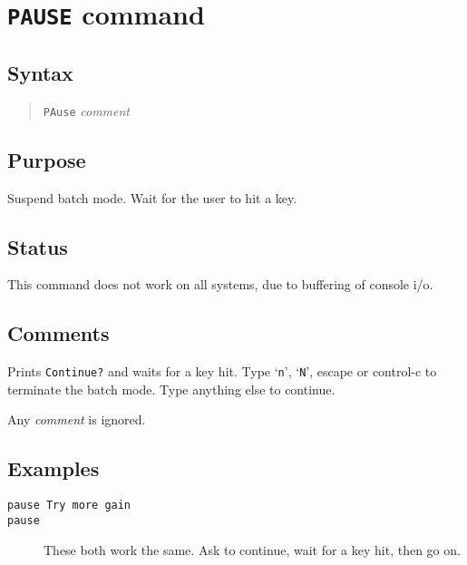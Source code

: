 \section{{\tt PAUSE} command}
\subsection{Syntax}
\begin{verse}
{\tt PAuse} {\it comment}
\end{verse}
\subsection{Purpose}

Suspend batch mode.  Wait for the user to hit a key.
\subsection{Status}

This command does not work on all systems, due to buffering of console i/o.
\subsection{Comments}

Prints {\tt Continue?} and waits for a key hit.  Type `{\tt n}', `{\tt N}',
escape or control-c to terminate the batch mode.  Type anything else to 
continue.

Any {\it comment} is ignored.
\subsection{Examples}

\begin{description}

\item[{\tt pause Try more gain}]

\item[{\tt pause}] These both work the same.  Ask to continue, wait for a
key hit, then go on.

\end{description}
